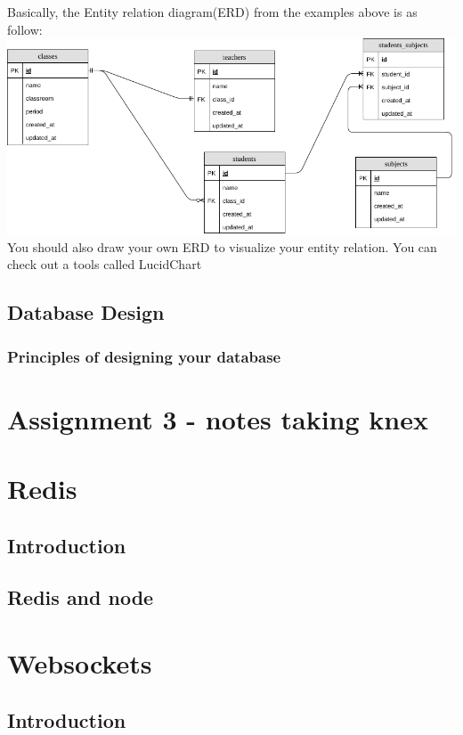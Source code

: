 \documentclass[a4paper]{article}
\begin{document}
Basically, the Entity relation diagram(ERD) from the examples above is as follow:\\
\includegraphics{img/school_entities.png}\\
You should also draw your own ERD to visualize your entity relation. You can check out a tools called LucidChart
\subsection{Database Design}
\subsubsection{Principles of designing your database}




\section{Assignment 3 - notes taking knex}

\section{Redis}
\subsection{Introduction}
\subsection{Redis and node}

\section{Websockets}
\subsection{Introduction}
\end{document}
